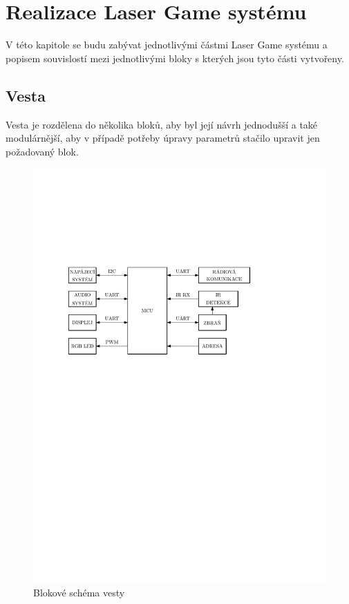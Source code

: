 \chapter{Realizace Laser Game systému}

 V této kapitole se budu zabývat jednotlivými částmi Laser Game systému a popisem souvislostí mezi jednotlivými bloky s kterých jsou tyto části vytvořeny.

\section{Vesta}

Vesta je rozdělena do několika bloků, aby byl její návrh jednodušší a také modulárnější, aby v případě potřeby úpravy parametrů stačilo upravit jen požadovaný blok.

\begin{figure}[H]
    \begin{center}
        \includegraphics[width=\textwidth]{img/vest-system}
    \end{center}
    \caption{Blokové schéma vesty}
\end{figure}

